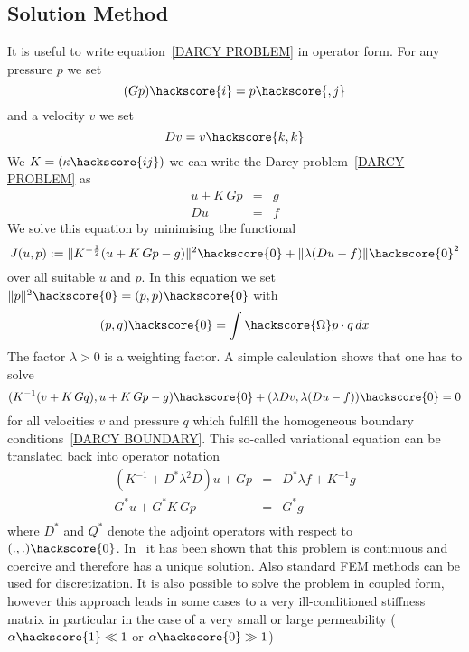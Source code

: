 \subsection{Solution Method \label{DARCY SOLVE}}
It is useful to write equation~\ref{DARCY PROBLEM} in operator form. For any pressure $p$
we set 
\begin{equation}
(Gp)\hackscore{i} =  p\hackscore{,j}
\end{equation}
and a velocity $v$ we set
\begin{equation}
Dv = v\hackscore{k,k}
\end{equation}
We $K=(\kappa\hackscore{ij})$ we can write the Darcy problem~\ref{DARCY PROBLEM} as
\begin{equation}
\begin{array}{rcl}
u + K \, Gp & = & g \\
Du & = & f 
\end{array}
\end{equation} 
We solve this equation by minimising the functional
\begin{equation}\label{DARCY COST}
J(u,p):=\|K^{-\frac{1}{2}}(u + K \, G p - g)\|^2\hackscore{0} +  \|\lambda (Du-f) \|\hackscore{0}^2 
\end{equation} 
over all suitable $u$ and $p$. In this equation we set $\|p\|^2\hackscore{0}=(p,p)\hackscore{0}$ with
\begin{equation}
(p,q)\hackscore{0} = \int\hackscore{\Omega } p\cdot q \, dx
\end{equation} 
The factor $\lambda>0$ is a weighting factor.
A simple calculation shows that
one has to solve
\begin{equation}
( K^{-1} (v + K \, Gq) , u +K \, G p - g)\hackscore{0} +  (\lambda Dv,\lambda (Du-f) )\hackscore{0} =0 
\end{equation} 
for all velocities $v$ and pressure $q$ which fulfill the homogeneous boundary conditions~\ref{DARCY BOUNDARY}.
This so-called variational equation can be translated back into operator notation
\begin{equation}
\begin{array}{rcl}
(K^{-1}+ D^*\lambda^2 D)u + Gp & = &  D^*\lambda f + K^{-1} g \\
G^*u  + G^*K \, G p & = & G^*g \\ 
\end{array}
\end{equation} 
where $D^*$ and $Q^*$ denote the  adjoint operators with respect to $(.,.)\hackscore{0}$. 
In~\cite{LEASTSQUARESFEM1994} it has been shown that this problem is continuous and coercive and therefore has a unique solution. Also standard FEM methods can be used for discretization. It is also possible 
to solve the problem in coupled form, however this approach leads in some cases to a very ill-conditioned stiffness matrix in particular in the case of a very small or large permeability ($\alpha\hackscore{1} \ll 1$ or $\alpha\hackscore{0} \gg 1$)  


